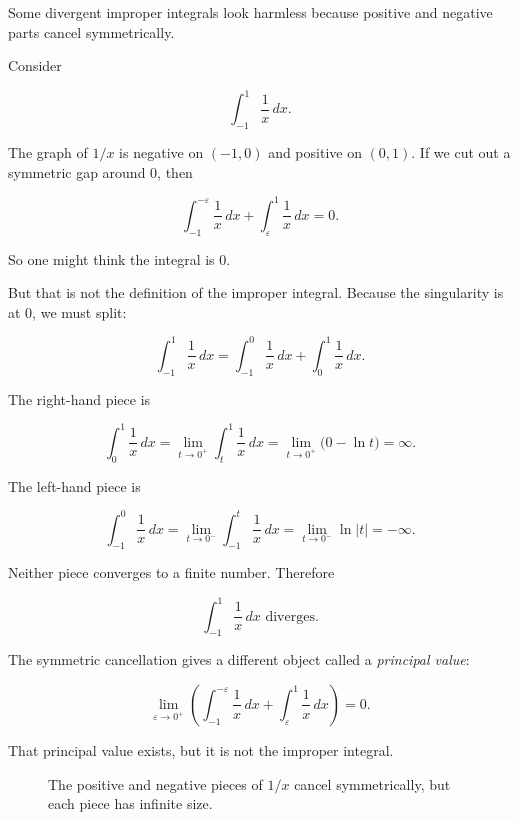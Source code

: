 Some divergent improper integrals look harmless because positive and negative parts
cancel symmetrically.

Consider

\[
\int_{-1}^{1}\frac1x\,dx.
\]

The graph of \(1/x\) is negative on \((-1,0)\) and positive on \((0,1)\).  If we cut out a
symmetric gap around \(0\), then

\[
\int_{-1}^{-\varepsilon}\frac1x\,dx
+
\int_{\varepsilon}^{1}\frac1x\,dx
=
0.
\]

So one might think the integral is \(0\).

But that is not the definition of the improper integral.  Because the singularity is at
\(0\), we must split:

\[
\int_{-1}^{1}\frac1x\,dx
=
\int_{-1}^{0}\frac1x\,dx
+
\int_0^1\frac1x\,dx.
\]

The right-hand piece is

\[
\int_0^1 \frac1x\,dx
=
\lim_{t\to0^+}\int_t^1 \frac1x\,dx
=
\lim_{t\to0^+}\bigl(0-\ln t\bigr)
=
\infty.
\]

The left-hand piece is

\[
\int_{-1}^{0} \frac1x\,dx
=
\lim_{t\to0^-}\int_{-1}^{t} \frac1x\,dx
=
\lim_{t\to0^-}\ln|t|
=
-\infty.
\]

Neither piece converges to a finite number.  Therefore

\[
\boxed{
\int_{-1}^{1}\frac1x\,dx
\text{ diverges.}
}
\]

The symmetric cancellation gives a different object called a \emph{principal value}:

\[
\lim_{\varepsilon\to0^+}
\left(
\int_{-1}^{-\varepsilon}\frac1x\,dx
+
\int_{\varepsilon}^{1}\frac1x\,dx
\right)
=
0.
\]

That principal value exists, but it is not the improper integral.

\begin{figure}[h]
\centering
{}
\caption{The positive and negative pieces of \(1/x\) cancel symmetrically, but each piece has infinite size.}
\label{fig:principal-value-one-over-x}
\end{figure}

